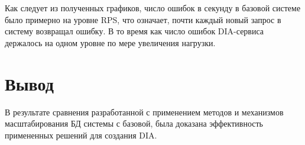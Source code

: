 Как следует из полученных графиков, число ошибок в секунду в базовой системе было примерно на уровне RPS, что означает, почти каждый новый запрос в систему возвращал ошибку. В то время как число ошибок DIA-сервиса держалось на одном уровне по мере увеличения нагрузки.





\section*{Вывод}

В результате сравнения разработанной с применением методов и механизмов масштабирования БД системы с базовой, была доказана эффективность примененных решений для создания DIA.
